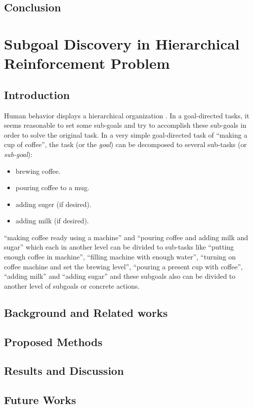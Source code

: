 \documentclass[letterpaper,titlepage]{article}
\begin{document}
\subsection{Conclusion}
\newpage

\section{Subgoal Discovery in Hierarchical Reinforcement Problem}
\label{sec:HRL}

\subsection{Introduction}
Human behavior displays a hierarchical organization \citep{PLOS:HRL:2014,HRL-BOTVINICK:2009}. In a goal-directed tasks, it seems reasonable to 
set some sub-goals and try to accomplish these sub-goals in order to solve the original task. In a very simple goal-directed task of ``making a cup of coffee'', the task (or the \emph{goal}) can be decomposed to several sub-tasks (or \emph{sub-goal}):
\begin{itemize}
\item brewing coffee.
\item pouring coffee to a mug.
\item adding suger (if desired).
\item adding milk (if desired).
\end{itemize}
“making coffee ready using a machine” and “pouring coffee and adding milk and sugar” which each in another level can be divided to sub-tasks like “putting enough coffee in machine”, “filling machine with enough water”, “turning on coffee machine and set the brewing level”, “pouring a present cup with coffee”, “adding milk” and “adding sugar” and these subgoals also can be divided to another level of subgoals or concrete actions.

\subsection{Background and Related works}
\subsection{Proposed Methods}
\subsection{Results and Discussion}
\subsection{Future Works}
\end{document}
